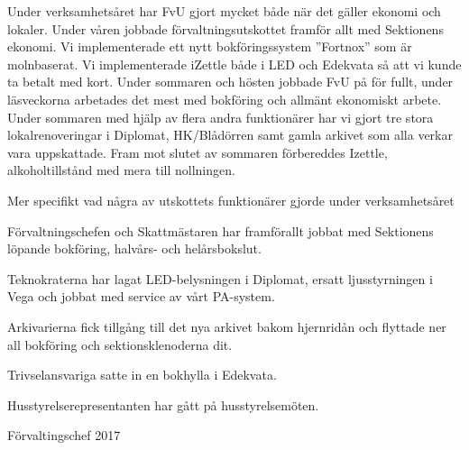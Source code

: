 \documentclass[../_main/handlingar.tex]{subfiles}
\begin{document}
Under verksamhetsåret har FvU gjort mycket både när det gäller ekonomi och lokaler. Under våren jobbade förvaltningsutskottet framför allt med Sektionens ekonomi. Vi implementerade ett nytt bokföringssystem ”Fortnox” som är molnbaserat. Vi implementerade iZettle både i LED och Edekvata så att vi kunde ta betalt med kort. Under sommaren och hösten jobbade FvU på för fullt, under läsveckorna arbetades det mest med bokföring och allmänt ekonomiskt arbete. Under sommaren med hjälp av flera andra funktionärer har vi gjort tre stora lokalrenoveringar i Diplomat, HK/Blådörren samt gamla arkivet som alla verkar vara uppskattade. Fram mot slutet av sommaren förbereddes Izettle, alkoholtillstånd med mera till nollningen.

Mer specifikt vad några av utskottets funktionärer gjorde under verksamhetsåret
\begin{dashlist}
  \item Förvaltningschefen och Skattmästaren har framförallt jobbat med Sektionens löpande bokföring, halvårs- och helårsbokslut.
  \item Teknokraterna har lagat LED-belysningen i Diplomat, ersatt ljusstyrningen i Vega  och jobbat med service av vårt PA-system.
  \item Arkivarierna fick tillgång till det nya arkivet bakom hjernridån och flyttade ner all bokföring och sektionsklenoderna dit.
  \item Trivselansvariga satte in en bokhylla i Edekvata.
  \item Husstyrelserepresentanten har gått på husstyrelsemöten.
\end{dashlist}


\begin{signatures}{1}
    \mvh
    \signature{Sophia Grimmei\ss\ Grahm}{Förvaltingschef 2017}
\end{signatures}
\end{document}
